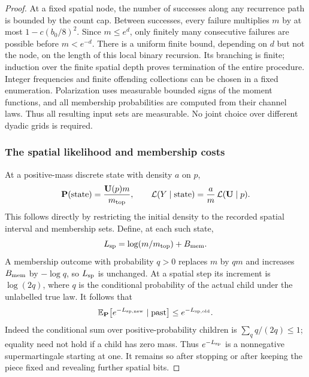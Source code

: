 \begin{proof}
At a fixed spatial node, the number of successes along any recurrence
path is bounded by the count cap.  Between successes, every failure
multiplies $m$ by at most $1-c(b_0/8)^2$.  Since $m\le e^d$, only
finitely many consecutive failures are possible before $m<e^{-d}$.
There is a uniform finite bound, depending on $d$ but not the node,
on the length of this local binary recursion.  Its branching is
finite; induction over the finite spatial depth proves termination of
the entire procedure.  Integer frequencies and finite offending
collections can be chosen in a fixed enumeration.  Polarization
uses measurable bounded signs of the moment functions, and all
membership probabilities are computed from their channel laws.
Thus all resulting input sets are measurable.  No joint choice over
different dyadic grids is required.

\subsubsection*{The spatial likelihood and membership costs}
At a positive-mass discrete state with density $a$ on $p$,
\begin{equation}
 \mathbf P(\text{state})=
       \frac{\mathbf U(p)m}{m_{\rm top}},\qquad
 \mathcal L(Y\mid\text{state})=
       \frac{a}{m}\,\mathcal L(\mathbf U\mid p).
 \label{eq:06-state-law}
\end{equation}
This follows directly by restricting the initial density to the
recorded spatial interval and membership sets.  Define, at each
such state,
\[
 L_{\rm sp}=\log(m/m_{\rm top})+B_{\rm mem}.
\]
A membership outcome with probability $q>0$ replaces $m$ by $qm$
and increases $B_{\rm mem}$ by $-\log q$, so $L_{\rm sp}$ is
unchanged.  At a spatial step its increment is
$\log(2q)$, where $q$ is the conditional probability of the actual
child under the unlabelled true law.  It follows that
\[
 \mathbb E_{\mathbf P}\!\left[
       e^{-L_{\rm sp,new}}\mid\text{past}\right]
       \le e^{-L_{\rm sp,old}}.
\]
Indeed the conditional sum over positive-probability children is
$\sum_q q/(2q)\le1$; equality need not hold if a child has zero
mass.  Thus $e^{-L_{\rm sp}}$ is a nonnegative supermartingale
starting at one.  It remains so after stopping or after keeping the
piece fixed and revealing further spatial bits.


\end{proof}
